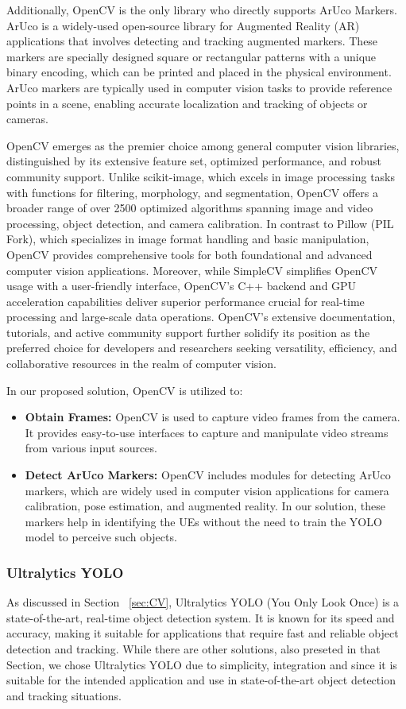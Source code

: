 Additionally, OpenCV is the only library who directly supports ArUco Markers.
ArUco is a widely-used open-source library for Augmented Reality (AR) applications that involves detecting and tracking augmented markers.
These markers are specially designed square or rectangular patterns with a unique binary encoding, which can be printed and placed in the physical environment.
ArUco markers are typically used in computer vision tasks to provide reference points in a scene, enabling accurate localization and tracking of objects or cameras.

OpenCV emerges as the premier choice among general computer vision libraries, distinguished by its extensive feature set, optimized performance, and robust community support.
Unlike scikit-image, which excels in image processing tasks with functions for filtering, morphology, and segmentation, OpenCV offers a broader range of over 2500 optimized algorithms spanning image and video processing, object detection, and camera calibration.
In contrast to Pillow (PIL Fork), which specializes in image format handling and basic manipulation, OpenCV provides comprehensive tools for both foundational and advanced computer vision applications.
Moreover, while SimpleCV simplifies OpenCV usage with a user-friendly interface, OpenCV's C++ backend and GPU acceleration capabilities deliver superior performance crucial for real-time processing and large-scale data operations.
OpenCV's extensive documentation, tutorials, and active community support further solidify its position as the preferred choice for developers and researchers seeking versatility, efficiency, and collaborative resources in the realm of computer vision.

In our proposed solution, OpenCV is utilized to:
\begin{itemize}
    \item \textbf{Obtain Frames:} OpenCV is used to capture video frames from the camera.
    It provides easy-to-use interfaces to capture and manipulate video streams from various input sources.
    \item \textbf{Detect ArUco Markers:} OpenCV includes modules for detecting ArUco markers, which are widely used in computer vision applications for camera calibration, pose estimation, and augmented reality.
    In our solution, these markers help in identifying the UEs without the need to train the YOLO model to perceive such objects.
\end{itemize}

\subsubsection{Ultralytics YOLO}
As discussed in Section ~\ref{sec:CV}, Ultralytics YOLO (You Only Look Once) is a state-of-the-art, real-time object detection system.
It is known for its speed and accuracy, making it suitable for applications that require fast and reliable object detection and tracking.
While there are other solutions, also preseted in that Section, we chose Ultralytics YOLO due to simplicity, integration and since it is suitable for the intended application and use in state-of-the-art object detection and tracking situations.

